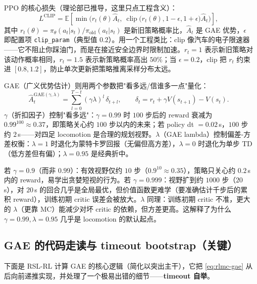 PPO 的核心损失（理论部已推导，这里只点工程含义）：
\begin{equation}
L^{\text{CLIP}}=\mathbb{E}\!\left[\min\!\Big(r_t(\theta)\hat A_t,\ \operatorname{clip}\big(r_t(\theta),1-\epsilon,1+\epsilon\big)\hat A_t\Big)\right],
\label{eq:rlmc-ppo-clip}
\end{equation}
其中 $r_t(\theta)=\pi_\theta(a_t|s_t)/\pi_{\text{old}}(a_t|s_t)$ 是新旧策略概率比，$\hat A_t$ 是 GAE 优势，$\epsilon$ 即配置项 \verb|clip_param|（典型值 $0.2$）。用一个工程类比：clip 像汽车的电子限速器——它不阻止你踩油门，而是在接近安全边界时限制加速。$r_t=1$ 表示新旧策略对该动作概率相同，$r_t=1.5$ 表示新策略概率高出 $50\%$；当 $\epsilon=0.2$，clip 把 $r_t$ 约束进 $[0.8,1.2]$，防止单次更新把策略推离采样分布太远。

GAE（广义优势估计）则用两个参数把"看多远/信谁多一点"量化：
\begin{equation}
\hat A_t^{\mathrm{GAE}(\gamma,\lambda)}=\sum_{l=0}^{T-t}(\gamma\lambda)^l\,\delta_{t+l},\qquad \delta_t=r_t+\gamma V(s_{t+1})-V(s_t).
\label{eq:rlmc-gae}
\end{equation}
$\gamma$（折扣因子）控制"看多远"：$\gamma=0.99$ 时 $100$ 步后的 reward 衰减为 $0.99^{100}\approx0.37$，即策略关心约 $100$ 步以内的未来；若 policy dt $=0.02\,$s，$100$ 步约 $2\,$s——对四足 locomotion 是合理的规划视野。$\lambda$（GAE lambda）控制偏差-方差权衡：$\lambda=1$ 时退化为蒙特卡罗回报（无偏但高方差），$\lambda=0$ 时退化为单步 TD（低方差但有偏）；$\lambda=0.95$ 是经典折中。

\begin{derivation}
若 $\gamma=0.9$（而非 $0.99$）：有效视野仅约 $10$ 步（$0.9^{10}\approx0.35$），策略只关心约 $0.2\,$s 内的 reward，易学出贪婪短视的行为。若 $\gamma=0.999$：视野扩到约 $1000$ 步（$20\,$s），对 $20\,$s 的回合几乎是全局最优，但价值函数更难学（要准确估计千步后的累积 reward），训练初期 critic 误差会被放大。$\lambda$ 同理：训练初期 critic 不准，更大的 $\lambda$（更靠 MC）能减少对坏 critic 的依赖，但方差更高。这解释了为什么 $\gamma{=}0.99,\lambda{=}0.95$ 几乎是 locomotion 的默认起点。
\end{derivation}

\subsection{GAE 的代码走读与 timeout bootstrap（关键）}

下面是 RSL-RL 计算 GAE 的核心逻辑（简化以突出主干），它把 \cref{eq:rlmc-gae} 从后向前递推实现，并处理了一个极易出错的细节——\textbf{timeout 自举}。

